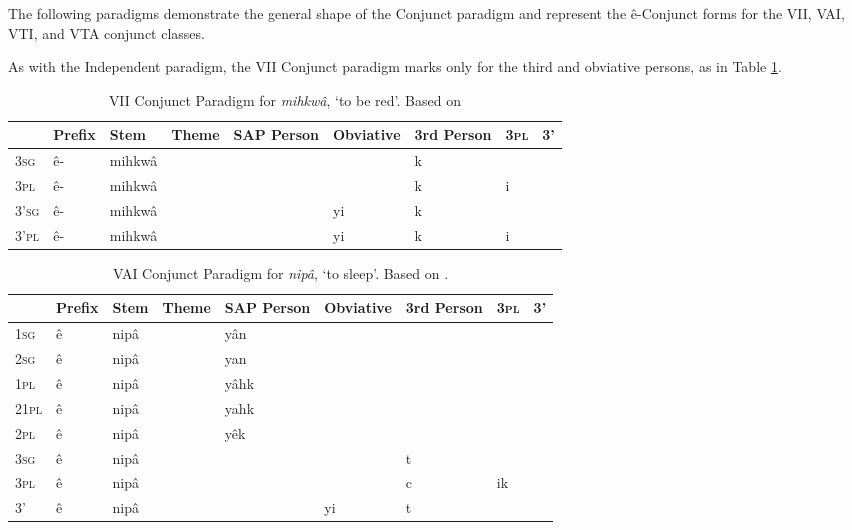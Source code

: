 The following paradigms demonstrate the general shape of the Conjunct paradigm and represent the ê-Conjunct forms for the VII, VAI, VTI, and VTA conjunct classes. 

As with the Independent paradigm, the VII Conjunct paradigm marks only for the third and obviative persons, as in Table \ref{tab:viicnjpara}. 
\begin{table}[h]
  \centering
\begin{tabular}{lllllllll}
    \toprule
     & Prefix & Stem     & Theme & SAP Person & Obviative & 3rd Person & 3\textsc{pl} & 3' \\
    \midrule
3\textsc{sg}  & ê-     & mihkwâ &       &            &           & k          &            &    \\
3\textsc{pl}  &  ê-     & mihkwâ &       &            &           & k          & i          &    \\
3'\textsc{sg} &  ê-      & mihkwâ &       &            & yi       & k          &            &    \\
3'\textsc{pl} &  ê-   & mihkwâ &       &            &yi       & k          & i          &     \\
    \bottomrule
  \end{tabular}
  \caption{
    VII Conjunct Paradigm for \textit{mihkwâ}, `to be red'. Based on \citep[413]{Wolvengrey2011} \label{tab:viicnjpara}
  }
\end{table}

\begin{table}[h]
  \centering
  \footnotesize
\begin{tabular}{lllllllll}
    \toprule
     & Prefix & Stem & Theme & SAP Person & Obviative & 3rd Person & 3\textsc{pl} & 3' \\
    \midrule
1\textsc{sg}    & ê      & nipâ &       & yân        &           &            &            &    \\
2\textsc{sg}    & ê      & nipâ &       & yan        &           &            &            &    \\
1\textsc{pl}  & ê      & nipâ &       & yâhk       &           &            &            &    \\
21\textsc{pl} & ê      & nipâ &       & yahk       &           &            &            &    \\
2\textsc{pl}  & ê      & nipâ &       & yêk        &           &            &            &    \\
3\textsc{sg}    & ê      & nipâ &       &            &           & t          &            &    \\
3\textsc{pl}  & ê      & nipâ &       &            &           & c          & ik         &    \\
3'   & ê      & nipâ &       &            & yi        & t          &            &   \\
    \bottomrule
  \end{tabular}
  \caption{
    VAI Conjunct Paradigm for \textit{nipâ}, `to sleep'. Based on \citep[415]{Wolvengrey2011}.\label{tab:vaicnjpara}
  }
\end{table}

